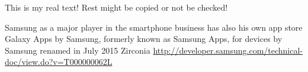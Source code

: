 This is my real text! Rest might be copied or not be checked!

Samsung as a major player in the smartphone business has also his own app store \cite{comscoreMarket}
Galaxy Apps by Samsung, formerly known as Samsung Apps, for devices by Samsung
renamed in July 2015
Zirconia
\url{http://developer.samsung.com/technical-doc/view.do?v=T000000062L}

